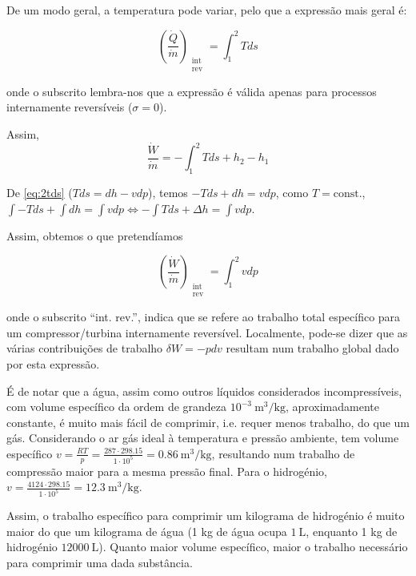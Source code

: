 De um modo geral, a temperatura pode variar, pelo que a expressão mais geral é:

\begin{equation}
    \left( \frac{\dot{Q}}{\dot{m}} \right)_{\substack{\text{int} \\ \text{rev}}} = \int_1^2 T ds
\end{equation}

onde o subscrito lembra-nos que a expressão é válida apenas para processos internamente reversíveis ($\sigma = 0$).

Assim, 
\begin{equation*}
    \frac{\dot{W}}{\dot{m}} = - \int_1^2 T ds + h_2 - h_1
\end{equation*}

De \ref{eq:2tds} ($ Tds = dh - v dp$), temos $-Tds + dh = v dp$, como $T=\text{const.}$, $\int -Tds + \int dh = \int v dp \Longleftrightarrow - \int T ds + \Delta h = \int v dp$.

Assim, obtemos o que pretendíamos

\begin{equation} \label{eq:w-intrev}
    \left( \frac{\dot{W}}{\dot{m}} \right)_{\substack{\text{int} \\ \text{rev}}} = \int_1^2 v dp
\end{equation}

onde o subscrito ``int. rev.'', indica que se refere ao trabalho total específico para um compressor/turbina internamente reversível. Localmente, pode-se dizer que as várias contribuições de trabalho $\delta W = - p dv$ resultam num trabalho global dado por esta expressão.

É de notar que a água, assim como outros líquidos considerados incompressíveis, com volume específico da ordem de grandeza $10^{-3}~\text{m}^3/\text{kg}$, aproximadamente constante, é muito mais fácil de comprimir, i.e. requer menos trabalho, do que um gás.
Considerando o ar gás ideal à temperatura e pressão ambiente, tem volume específico $v = \frac{RT}{p} = \frac{287 \cdot 298.15}{1\cdot 10^5} = 0.86~\text{m}^3/\text{kg}$, resultando num trabalho de compressão maior para a mesma pressão final.
Para o hidrogénio, $v = \frac{4124 \cdot 298.15}{1\cdot 10^5} = 12.3~\text{m}^3/\text{kg}$.

Assim, o trabalho específico para comprimir um kilograma de hidrogénio é muito maior do que um kilograma de água (1 kg de água ocupa $1~\text{L}$, enquanto 1 kg de hidrogénio $12000~\text{L}$). Quanto maior volume específico, maior o trabalho necessário para comprimir uma dada substância.

